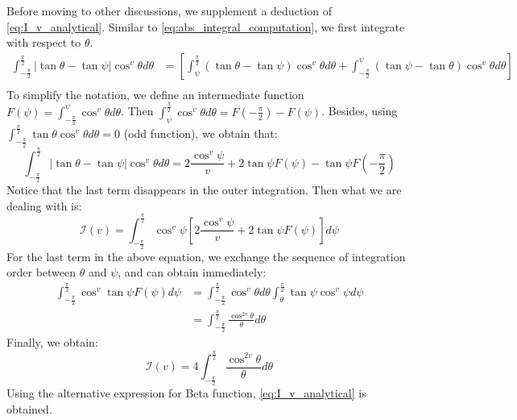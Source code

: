 \documentclass{article}
\begin{document}
Before moving to other discussions, we supplement a deduction
of \eqref{eq:I_v_analytical}.
Similar to \eqref{eq:abs_integral_computation},
we first integrate with respect to $\theta$.
\begin{align*}
    \int_{-\frac{\pi}{2}}^{\frac{\pi}{2}}
    |\tan\theta - \tan \psi|
    \cos^v\theta
    d\theta
    &=\left[
    \int_{\psi}^{\frac{\pi}{2}}
    (\tan\theta - \tan\psi)
    \cos^v\theta
    d\theta
    +
    \int_{-\frac{\pi}{2}}^{\psi}
    (\tan\psi - \tan\theta)
    \cos^v\theta
    d\theta
    \right]\\
\end{align*}
To simplify the notation, we define an intermediate function
$F(\psi) = \int_{-\frac{\pi}{2}}^{\psi} \cos^v\theta d\theta$.
Then $ \int_{\psi}^{\frac{\pi}{2}}
\cos^v\theta d\theta
= F(-\frac{\pi}{2}) - F(\psi)$.
Besides, using
$\int_{-\frac{\pi}{2}}^{\frac{\pi}{2}}
\tan\theta \cos^v \theta d\theta= 0
$  (odd function), we obtain that:
\begin{equation*}
    \int_{-\frac{\pi}{2}}^{\frac{\pi}{2}}
    |\tan\theta - \tan \psi|
    \cos^v\theta
    d\theta = 2 \frac{\cos^v \psi}{v}
    +2\tan\psi F(\psi) - \tan \psi F(-\frac{\pi}{2})
\end{equation*}
Notice that the last term disappears in the outer integration.
Then what we are dealing with is:
\begin{equation*}
    \mathcal{I}(v)
    =\int_{-\frac{\pi}{2}}^{\frac{\pi}{2}}
    \cos^v \psi \left[ 2 \frac{\cos^v \psi}{v}
    +2\tan\psi F(\psi) \right] d\psi
\end{equation*}
For the last term in the above equation, we exchange
the sequence of integration order between $\theta$ and $\psi$,
and can obtain immediately:
\begin{align*}
    \int_{-\frac{\pi}{2}}^{\frac{\pi}{2}}
    \cos^v \tan\psi F(\psi) d\psi
    &=  \int_{-\frac{\pi}{2}}^{\frac{\pi}{2}}
    \cos^v \theta d\theta
    \int_{\theta}^{\frac{\pi}{2}}\tan \psi \cos^v \psi d\psi \\
    &=\int_{-\frac{\pi}{2}}^{\frac{\pi}{2}}
    \frac{\cos^{2v}\theta}{\theta}d\theta
\end{align*}
Finally, we obtain:
\begin{equation*}
    \mathcal{I}(v)
    =4\int_{-\frac{\pi}{2}}^{\frac{\pi}{   2}}
    \frac{\cos^{2v}\theta}{\theta}d\theta
\end{equation*}
Using the alternative expression for Beta function,
\eqref{eq:I_v_analytical} is obtained.
\end{document}

